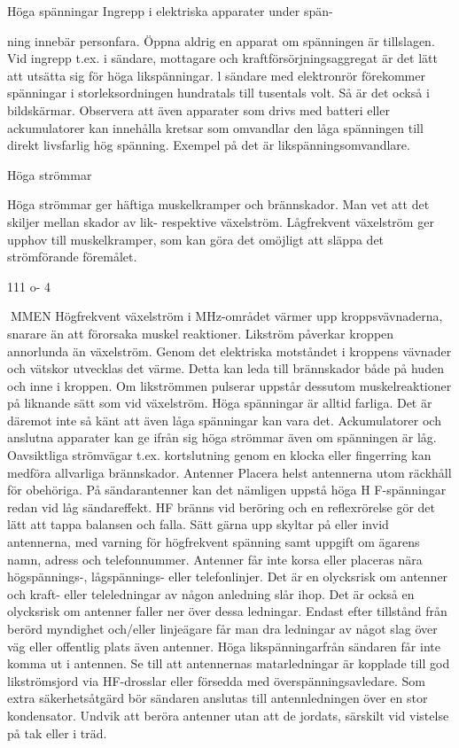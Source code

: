 Höga spänningar
Ingrepp i elektriska apparater under spän-

ning innebär personfara. Öppna aldrig en
apparat om spänningen är tillslagen. Vid
ingrepp t.ex. i sändare, mottagare och
kraftförsörjningsaggregat är det lätt att utsätta sig för höga likspänningar. l sändare
med elektronrör förekommer spänningar i
storleksordningen hundratals till tusentals
volt. Så är det också i bildskärmar.
Observera att även apparater som drivs
med batteri eller ackumulatorer kan innehålla kretsar som omvandlar den låga spänningen till direkt livsfarlig hög spänning. Exempel på det är likspänningsomvandlare.

Höga strömmar

Höga strömmar ger häftiga muskelkramper
och brännskador. Man vet att det skiljer
mellan skador av lik- respektive växelström.
Lågfrekvent växelström ger upphov till
muskelkramper, som kan göra det omöjligt
att släppa det strömförande föremålet.

111 o- 4

MMEN
Högfrekvent växelström i MHz-området
värmer upp kroppsvävnaderna, snarare än
att förorsaka muskel reaktioner.
Likström påverkar kroppen annorlunda
än växelström. Genom det elektriska motståndet i kroppens vävnader och vätskor
utvecklas det värme. Detta kan leda till brännskador både på huden och inne i kroppen.
Om likströmmen pulserar uppstår dessutom
muskelreaktioner på liknande sätt som vid
växelström.
Höga spänningar är alltid farliga. Det är
däremot inte så känt att även låga spänningar kan vara det. Ackumulatorer och anslutna apparater kan ge ifrån sig höga strömmar även om spänningen är låg. Oavsiktliga
strömvägar t.ex. kortslutning genom en
klocka eller fingerring kan medföra allvarliga
brännskador.
Antenner
Placera helst antennerna utom räckhåll för
obehöriga. På sändarantenner kan det nämligen uppstå höga H F-spänningar redan vid
låg sändareffekt. HF bränns vid beröring och
en reflexrörelse gör det lätt att tappa balansen och falla. Sätt gärna upp skyltar på eller
invid antennerna, med varning för högfrekvent spänning samt uppgift om ägarens
namn, adress och telefonnummer.
Antenner får inte korsa eller placeras
nära högspännings-, lågspännings- eller
telefonlinjer. Det är en olycksrisk om antenner och kraft- eller teleledningar av någon
anledning slår ihop. Det är också en olycksrisk om antenner faller ner över dessa ledningar.
Endast efter tillstånd från berörd myndighet
och/eller linjeägare får man dra ledningar av
något slag över väg eller offentlig plats även antenner.
Höga likspänningarfrån sändaren får inte
komma ut i antennen. Se till att antennernas
matarledningar är kopplade till god likströmsjord via HF-drosslar eller försedda med
överspänningsavledare. Som extra säkerhetsåtgärd bör sändaren anslutas till antennledningen över en stor kondensator.
Undvik att beröra antenner utan att de
jordats, särskilt vid vistelse på tak eller i träd.

